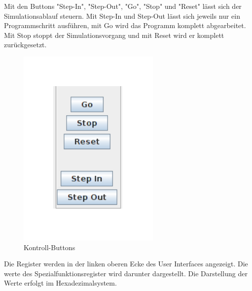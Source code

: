 \noindent Mit den Buttons "Step-In", "Step-Out", "Go", "Stop" und "Reset" lässt sich der Simulationsablauf steuern. Mit Step-In und Step-Out lässt sich jeweils nur ein Programmschritt ausführen, mit Go wird das Programm komplett abgearbeitet. Mit Stop stoppt der Simulationsvorgang und mit Reset wird er komplett zurückgesetzt.

\begin{figure}[h]
\centering
\includegraphics[scale=0.5]{Bilder/Buttons.pdf}
\caption{Kontroll-Buttons}
\end{figure}

Die Register werden in der linken oberen Ecke des User Interfaces angezeigt. Die werte des Spezialfunktionsregister wird darunter dargestellt. Die  Darstellung der Werte erfolgt im Hexadezimalsystem.

